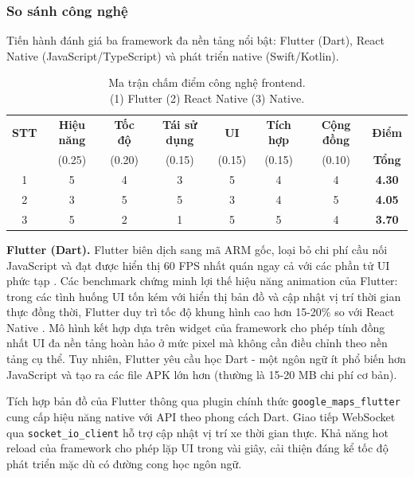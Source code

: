 \subsubsection*{So sánh công nghệ}

Tiến hành đánh giá ba framework đa nền tảng nổi bật: Flutter (Dart), React Native (JavaScript/TypeScript) và phát triển native (Swift/Kotlin).

\begin{table}[h]
\centering
\caption{Ma trận chấm điểm công nghệ frontend. \\ \small{(1) Flutter\; (2) React Native\; (3) Native.}}
\small
\begin{tabular}{|c|c|c|c|c|c|c|c|}
\hline
\textbf{STT} & \textbf{Hiệu năng} & \textbf{Tốc độ} & \textbf{Tái sử dụng} &
\textbf{UI} & \textbf{Tích hợp} & \textbf{Cộng đồng} & \textbf{Điểm} \\
 & (0.25) & (0.20) & (0.15) & (0.15) & (0.15) & (0.10) & \textbf{Tổng} \\
\hline
1 & 5 & 4 & 3 & 5 & 4 & 4 & \textbf{4.30} \\
\hline
2 & 3 & 5 & 5 & 3 & 4 & 5 & \textbf{4.05} \\
\hline
3 & 5 & 2 & 1 & 5 & 5 & 4 & \textbf{3.70} \\
\hline
\end{tabular}
\end{table}

\textbf{Flutter (Dart).} Flutter biên dịch sang mã ARM gốc, loại bỏ chi phí cầu nối JavaScript và đạt được hiển thị 60 FPS nhất quán ngay cả với các phần tử UI phức tạp \cite{biorn2018}. Các benchmark chứng minh lợi thế hiệu năng animation của Flutter: trong các tình huống UI tốn kém với hiển thị bản đồ và cập nhật vị trí thời gian thực đồng thời, Flutter duy trì tốc độ khung hình cao hơn 15-20\% so với React Native \cite{amatya2020}. Mô hình kết hợp dựa trên widget của framework cho phép tính đồng nhất UI đa nền tảng hoàn hảo ở mức pixel mà không cần điều chỉnh theo nền tảng cụ thể. Tuy nhiên, Flutter yêu cầu học Dart - một ngôn ngữ ít phổ biến hơn JavaScript và tạo ra các file APK lớn hơn (thường là 15-20 MB chi phí cơ bản).

Tích hợp bản đồ của Flutter thông qua plugin chính thức \texttt{google\_maps\_flutter} cung cấp hiệu năng native với API theo phong cách Dart. Giao tiếp WebSocket qua \texttt{socket\_io\_client} hỗ trợ cập nhật vị trí xe thời gian thực. Khả năng hot reload của framework cho phép lặp UI trong vài giây, cải thiện đáng kể tốc độ phát triển mặc dù có đường cong học ngôn ngữ.

